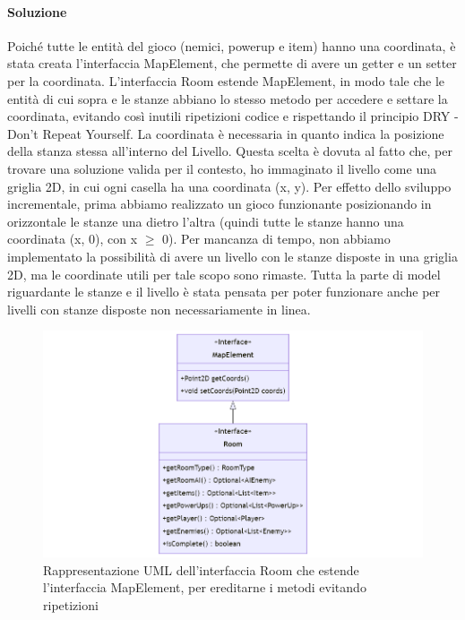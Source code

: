 \documentclass[a4paper,12pt]{report}
\begin{document}
\paragraph{Soluzione} Poiché tutte le entità del gioco (nemici, powerup e item) hanno una coordinata,
è stata creata l'interfaccia MapElement, che permette di avere un getter e un setter per la coordinata. 
L'interfaccia Room estende MapElement, in modo tale che le entità di cui sopra e 
le stanze abbiano lo stesso metodo per accedere e settare la coordinata, evitando
così inutili ripetizioni codice e rispettando il principio DRY - Don't Repeat Yourself.
La coordinata è necessaria in quanto indica la posizione della stanza stessa all'interno del Livello.
Questa scelta è dovuta al fatto che, per trovare una soluzione valida per il contesto, ho immaginato 
il livello come una griglia 2D, in cui ogni casella ha una coordinata (x, y).
Per effetto dello sviluppo incrementale, prima abbiamo realizzato un gioco funzionante posizionando 
in orizzontale le stanze una dietro l'altra (quindi tutte le stanze hanno una coordinata (x, 0), con x $\geq$ 0).
Per mancanza di tempo, non abbiamo implementato la possibilità di avere un livello con le stanze disposte in una
griglia 2D, ma le coordinate utili per tale scopo sono rimaste. Tutta la parte di model riguardante le stanze 
e il livello è stata pensata per poter funzionare anche per livelli con stanze disposte non necessariamente in linea.
\begin{figure}[H]
    \centering{}
    \includegraphics[scale=0.5]{diagram/mapelement.png}
    \caption{Rappresentazione UML dell'interfaccia Room che estende l'interfaccia MapElement, per ereditarne i metodi evitando ripetizioni}
    \label{img:mapelement}
\end{figure}
\end{document}
